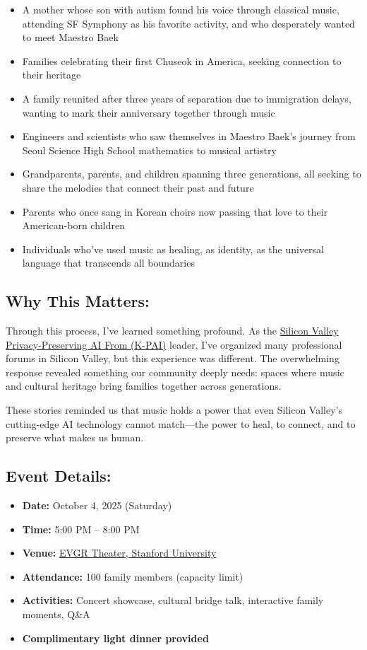 \documentclass[11pt,letterpaper]{article}
\begin{document}
\begin{itemize}[leftmargin=*]
\item A mother whose son with autism found his voice through classical music, attending SF Symphony as his favorite activity, and who desperately wanted to meet Maestro Baek
\item Families celebrating their first Chuseok in America, seeking connection to their heritage
\item A family reunited after three years of separation due to immigration delays, wanting to mark their anniversary together through music
\item Engineers and scientists who saw themselves in Maestro Baek's journey from Seoul Science High School mathematics to musical artistry
\item Grandparents, parents, and children spanning three generations, all seeking to share the melodies that connect their past and future
\item Parents who once sang in Korean choirs now passing that love to their American-born children
\item Individuals who've used music as healing, as identity, as the universal language that transcends all boundaries
\end{itemize}

\subsection*{Why This Matters:}

Through this process, I've learned something profound.
As the \href{https://k-privateai.github.io/}{Silicon Valley Privacy-Preserving AI From (K-PAI)} leader,
I've organized many professional forums in Silicon Valley, but this experience was different.
The overwhelming response revealed something our community deeply needs: spaces where music and cultural heritage bring families together across generations.

These stories reminded us that music holds a power that even Silicon Valley's cutting-edge AI technology cannot match---the power to heal, to connect, and to preserve what makes us human.

\subsection*{Event Details:}

\begin{itemize}[leftmargin=*]
\item \textbf{Date:} October 4, 2025 (Saturday)
\item \textbf{Time:} 5:00 PM -- 8:00 PM
\item \textbf{Venue:} \href{https://maps.app.goo.gl/W3qRPoNthuNzsjG5A}{EVGR Theater, Stanford University}
\item \textbf{Attendance:} 100 family members (capacity limit)
\item \textbf{Activities:} Concert showcase, cultural bridge talk, interactive family moments, Q\&A
\item \textbf{Complimentary light dinner provided}
\end{itemize}
\end{document}
